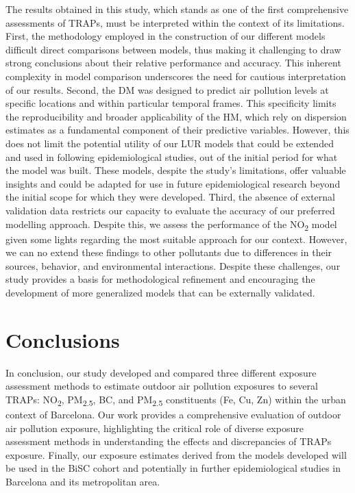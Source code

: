 \documentclass{article}
\begin{document}
The results obtained in this study, which stands as one of the first comprehensive assessments of TRAPs, must be interpreted within the context of its limitations. 
First, the methodology employed in the construction of our different models difficult direct comparisons between models, thus making it challenging to draw strong conclusions about their relative performance and accuracy. This inherent complexity in model comparison underscores the need for cautious interpretation of our results. Second, the DM was designed to predict air pollution levels at specific locations and within particular temporal frames. This specificity limits the reproducibility and broader applicability of the HM, which rely on dispersion estimates as a fundamental component of their predictive variables. However, this does not limit the potential utility of our LUR models that could be extended and used in  following epidemiological studies, out of the initial period for what the model was built. These models, despite the study's limitations, offer valuable insights and could be adapted for use in future epidemiological research beyond the initial scope for which they were developed. Third, the absence of external validation data restricts our capacity to evaluate  the accuracy of our preferred modelling approach. Despite this, we assess the performance of the NO\textsubscript{2} model given some lights regarding the most suitable approach for our context. However, we can no extend these findings to other pollutants due to differences in their sources, behavior, and environmental interactions. Despite these challenges, our study provides a basis for methodological refinement and encouraging the development of more generalized models that can be  externally validated. 

\section{Conclusions}

In conclusion, our study developed and compared three different exposure assessment methods to estimate outdoor air pollution exposures to several TRAPs: NO\textsubscript{2}, PM\textsubscript{2.5}, BC, and PM\textsubscript{2.5} constituents (Fe, Cu, Zn) within the urban context of Barcelona. Our work provides a comprehensive evaluation of outdoor air pollution exposure, highlighting the critical role of diverse exposure assessment methods in understanding the effects and discrepancies of TRAPs exposure. Finally, our exposure estimates derived from the models developed will be used in the BiSC cohort and potentially in further epidemiological studies in Barcelona and its metropolitan area.

\newpage


\end{document}
